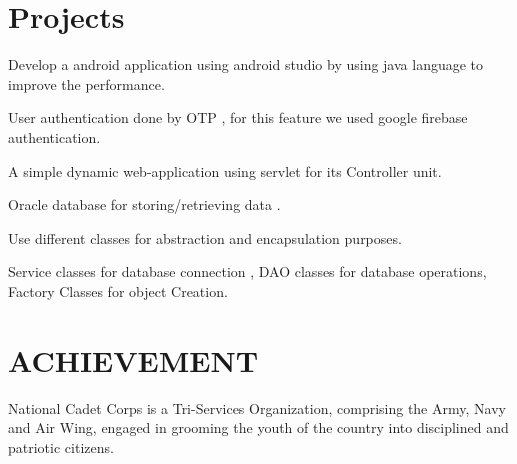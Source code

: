 \documentclass[]{deedy-resume-reversed}
\begin{document}
\begin{minipage}[t]{0.60\textwidth}
\section{Projects}
\begin{tightemize}
\item Develop a android application using android studio by using java language to improve the performance.
\item User authentication done by OTP , for this feature we used google firebase authentication.
\end{tightemize}
\sectionsep

\begin{tightemize}
\item A simple dynamic web-application using servlet for its Controller unit.
\item Oracle database for storing/retrieving data .
\item Use different classes for abstraction and encapsulation purposes.
\item Service classes for database connection , DAO classes for database operations, Factory Classes for object Creation.
\end{tightemize}
\sectionsep



\section{ACHIEVEMENT }
\begin{tightemize}
\item National Cadet Corps is a Tri-Services Organization, comprising the Army, Navy and Air Wing, engaged in grooming the youth of the country into disciplined and patriotic citizens.
\end{tightemize}
\sectionsep \\



\end{minipage}
\end{document}
